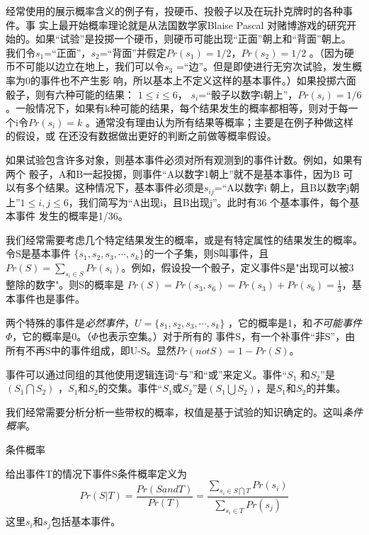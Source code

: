 经常使用的展示概率含义的例子有，投硬币、投骰子以及在玩扑克牌时的各种事件。事
实上最开始概率理论就是从法国数学家Blaise Pascal
对赌博游戏的研究开始的。如果“试验”是投掷一个硬币，则硬币可能出现“正面”朝上和“背面”朝上。
我们令$s_1$=“正面”，$s_2$=“背面”并假定$Pr(s_1)=1/2$，$Pr(s_2)=1/2$
。（因为硬币不可能以边立在地上，我们可以令$s_3$
=“边”。但是即使进行无穷次试验，发生概率为0的事件也不产生影
响，所以基本上不定义这样的基本事件。）如果投掷六面骰子，则有六种可能的结果：
$1 \leq i\leq 6$， $s_i$=“骰子以数字i朝上”，$Pr(s_i)=1/6$
。一般情况下，如果有k种可能的结果，每个结果发生的概率都相等，则对于每一个i令$Pr(s_i)=k$
。通常没有理由认为所有结果等概率；主要是在例子种做这样的假设，或
在还没有数据做出更好的判断之前做等概率假设。

如果试验包含许多对象，则基本事件必须对所有观测到的事件计数。例如，如果有两个
骰子，A和B一起投掷，则事件“A以数字1朝上”就不是基本事件，因为B
可以有多个结果。这种情况下，基本事件必须是$s_{ij}$=“A以数字i
朝上，且B以数字j朝上”$1 \leq i, j \leq
6$，我们简写为“A出现i，且B出现j”。此时有36
个基本事件，每个基本事件 发生的概率是1/36。

我们经常需要考虑几个特定结果发生的概率，或是有特定属性的结果发生的概率。令S是基本事件
$\{s_1, s_2, s_3, \cdots, s_k\}$的一个子集，则S叫事件，且$Pr(S)=
\sum_{s_i \in S}
Pr(s_i)$。例如，假设投一个骰子，定义事件S是"出现可以被3整除的数字"。则S的概率是
$Pr(S)=Pr({s_3, s_6})=Pr(s_3) + Pr(s_6)=
\frac{1}{3}$，基本事件也是事件。

两个特殊的事件是\emph{必然事件}，$U= \{s_1, s_2, s_3, \cdots, s_k\}$
，它的概率是1，和\emph{不可能事件}$\Phi$，它的概率是0。（$\Phi$也表示空集。）对于所有的
事件S，有一个补事件“非S”，由所有不再S中的事件组成，即U-S。显然$Pr(not
S)=1-Pr(S)$。

事件可以通过同组的其他使用逻辑连词“与”和“或”来定义。事件“$S_1$
和$S_2$”是$(S_1\bigcap S_2)$
，$S_1$和$S_2$的交集。事件“$S_1$或$S_2$”是$(S_1\bigcup
S_2)$，是$S_1$和$S_2$的并集。

我们经常需要分析分析一些带权的概率，权值是基于试验的知识确定的。这叫\emph{条件概率}。

\begin{definition} \label{Def:ConditionalProbability}
条件概率

给出事件T的情况下事件S条件概率定义为
\begin{equation}\label{Equa:ConditionalProbability}
    Pr(S|T)= \frac{Pr(S and T)}{Pr(T)}= \frac{\sum_{s_i\in S\bigcap T}Pr(s_i)}{\sum_{s_i\in T}Pr(s_j)}
\end{equation}
这里$s_i$和$s_j$包括基本事件。
\end{definition}

